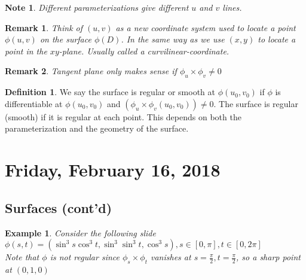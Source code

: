 \documentclass[12pt]{article}
\theoremstyle{plain}
\newtheorem*{remark}{Remark}
\newtheorem*{note}{Note}
\newtheorem{example}[theorem]{Example}
\theoremstyle{definition}
\newtheorem{definition}[theorem]{Definition}
\begin{document}
\begin{note}
	Different parameterizations give different $u$ and $v$ lines.
\end{note}

\begin{remark}
	Think of $(u,v)$ as a new coordinate system used to locate a point $\phi (u,v)$ on the surface $\phi (D)$. In the same way as we use $(x,y)$ to locate a point in the $xy$-plane. Usually called a curvilinear-coordinate.
\end{remark}

\begin{remark}
	Tangent plane only makes sense if $\phi_u \times \phi_v \neq 0$
\end{remark}

\begin{definition}
	We say the surface is regular or smooth at $\phi (u_0, v_0)$ if $\phi$ is differentiable at $\phi (u_0, v_0)$ and $(\phi_u \times \phi_v (u_0, v_0)) \neq 0$. The surface is regular (smooth) if it is regular at each point. This depends on both the parameterization and the geometry of the surface.
\end{definition}

\newpage

\section{Friday, February 16, 2018}

\subsection{Surfaces (cont'd)}

\begin{example}
	Consider the following slide\\
	$\phi (s,t) = (\sin^3 s \cos^3 t, \sin^3 \sin^3 t, \cos^3 s), s \in [0,\pi], t\in [0,2\pi]$\\
	Note that $\phi$ is not regular since  $\phi_s \times \phi_t$ vanishes at $s=\frac{\pi}{2}, t=\frac{\pi}{2}$, so a sharp point at $(0,1,0)$
\end{example}
\end{document}
